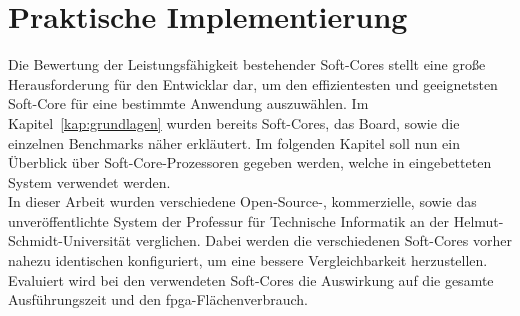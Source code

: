 %
%
%
%

\chapter{Praktische Implementierung}\label{kap:implementierung}
Die Bewertung der Leistungsfähigkeit bestehender Soft-Cores stellt eine große Herausforderung für den Entwicklar dar, um den effizientesten und geeignetsten Soft-Core
für eine bestimmte Anwendung auszuwählen. Im Kapitel~\ref{kap:grundlagen} wurden bereits Soft-Cores, das Board, sowie die einzelnen Benchmarks näher erkläutert. Im folgenden Kapitel
soll nun ein Überblick über Soft-Core-Prozessoren gegeben werden, welche in eingebetteten System verwendet werden. \\
In dieser Arbeit wurden verschiedene Open-Source-, kommerzielle, sowie das unveröffentlichte System der Professur für Technische Informatik an der Helmut-Schmidt-Universität verglichen.
Dabei werden die verschiedenen Soft-Cores vorher nahezu identischen konfiguriert, um eine bessere Vergleichbarkeit herzustellen. Evaluiert wird bei den verwendeten Soft-Cores
die Auswirkung auf die gesamte Ausführungszeit und den \ac{fpga}-Flächenverbrauch.

